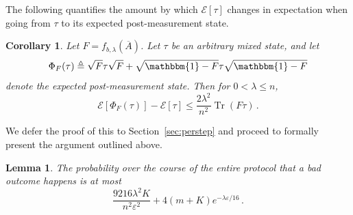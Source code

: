 \documentclass[10pt]{article}
\renewcommand{\epsilon}{\varepsilon}
\newcommand{\energy}{\mathcal{E}}
\newcommand{\luders}{\Phi}
\DeclareMathOperator{\Tr}{Tr}
\newcommand{\Id}{\mathbbm{1}}
\newtheorem{lemma}[theorem]{Lemma}
\newtheorem{corollary}[theorem]{Corollary}
\newcommand{\sitan}[1]{{\color{red}[sitan: #1]}}
\renewcommand{\sitan}[1]{}
\newcommand{\lift}[1]{\overline{#1}}
\begin{document}
\noindent The following quantifies the amount by which $\energy[\tau]$ changes in expectation when going from $\tau$ to its expected post-measurement state.

\begin{corollary}\label{cor:damage}
    Let $F = f_{b,\lambda}(\lift{A})$. Let $\tau$ be an arbitrary mixed state, and let
    \begin{equation}
        \luders_F(\tau)\triangleq \sqrt{F}\tau\sqrt{F} + \sqrt{\Id - F}\tau\sqrt{\Id - F}
    \end{equation}
    denote the expected post-measurement state. Then for $0 < \lambda \le n$,
    \begin{equation}
        \energy[\luders_F(\tau)] - \energy[\tau] \le \frac{2\lambda^2}{n^2}\Tr(F\tau)\,. \label{eq:onestep}
    \end{equation}
\end{corollary}


\noindent We defer the proof of this to Section~\ref{sec:perstep} and proceed to formally present the argument outlined above.

\begin{lemma}\label{lem:badbound}
    The probability over the course of the entire protocol that a bad outcome happens is at most
    \begin{equation}
        \frac{9216\lambda^2 K}{n^2\epsilon^2} + 4(m+K) e^{-\lambda\epsilon/16}\,.
    \end{equation}
\end{lemma}
\end{document}

